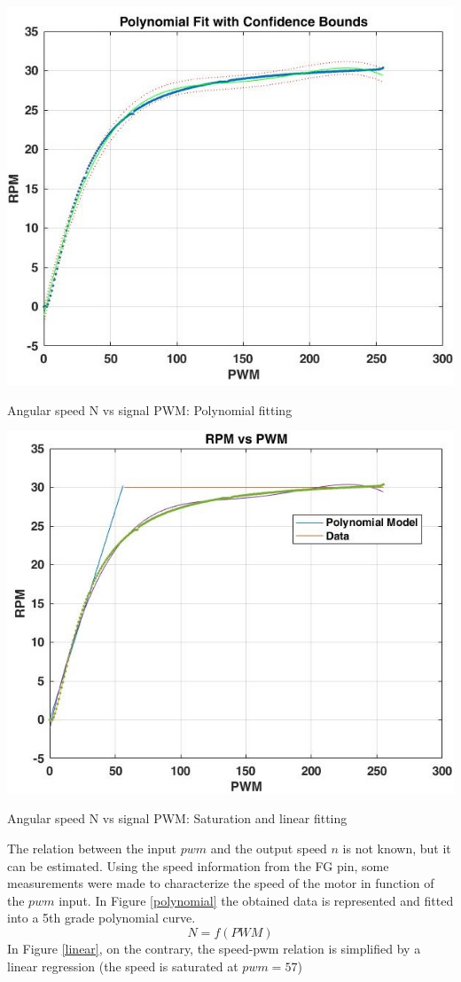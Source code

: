 \newpage
\begin{marginfigure}[0cm]
	\includegraphics[width=1.2\linewidth]{figs/05/own/polynomial}
	\caption{Angular speed N vs signal PWM: Polynomial fitting}
	\label{polynomial}
\end{marginfigure}
\begin{marginfigure}[0cm]
	\includegraphics[width=1.2\linewidth]{figs/05/own/linear}
	\caption{Angular speed N vs signal PWM: Saturation and linear fitting}
	\label{linear}
\end{marginfigure}
The relation between the input $pwm$ and the output speed $n$ is not known, but it can be estimated. Using the speed information from the FG pin, some measurements were made to characterize the speed of the motor in function of the $pwm$ input. In Figure \ref{polynomial} the obtained data is represented and fitted into a 5th grade polynomial curve. \[N=f(PWM)\] In Figure \ref{linear}, on the contrary, the speed-pwm relation is simplified by a linear regression (the speed is saturated at $pwm=57$)
